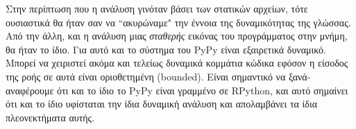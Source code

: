 Στην περίπτωση που η ανάλυση γινόταν βάσει των στατικών αρχείων, τότε ουσιαστικά
θα ήταν σαν να ``ακυρώναμε" την έννοια της δυναμικότητας της γλώσσας. Από την
άλλη, και η ανάλυση μιας \textit{σταθερής} εικόνας του προγράμματος στην μνήμη,
θα ήταν το ίδιο. Για αυτό και το σύστημα του PyPy είναι εξαιρετικά δυναμικό.
Μπορεί να χειριστεί ακόμα και τελείως δυναμικά κομμάτια κώδικα εφόσον η είσοδος
της ροής σε αυτά είναι οριοθετημένη (bounded)\cite{rigo2005}. Είναι σημαντικό να
ξανά-αναφέρουμε ότι και το ίδιο το PyPy είναι γραμμένο σε RPython, και αυτό
σημαίνει ότι και το ίδιο υφίσταται την ίδια δυναμική ανάλυση και απολαμβάνει τα
ίδια πλεονεκτήματα αυτής.

